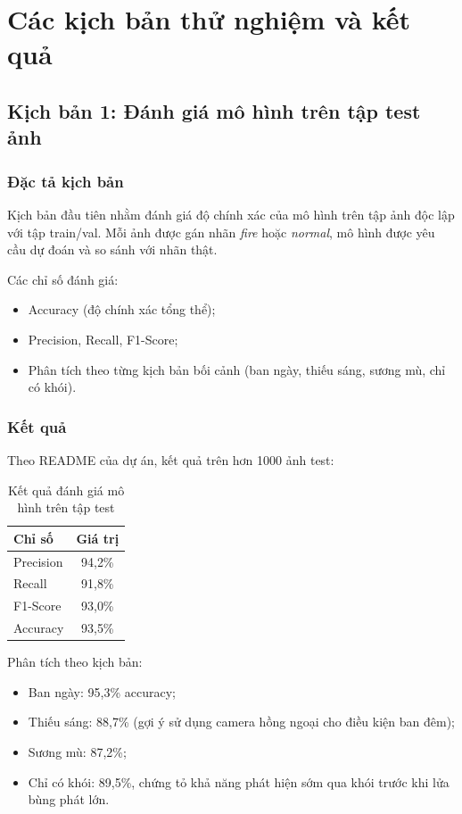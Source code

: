 \documentclass[12pt,a4paper]{report}
\begin{document}
\chapter{Các kịch bản thử nghiệm và kết quả}

\section{Kịch bản 1: Đánh giá mô hình trên tập test ảnh}

\subsection{Đặc tả kịch bản}

Kịch bản đầu tiên nhằm đánh giá độ chính xác của mô hình trên tập ảnh độc lập với tập train/val. Mỗi ảnh được gán nhãn \emph{fire} hoặc \emph{normal}, mô hình được yêu cầu dự đoán và so sánh với nhãn thật.

Các chỉ số đánh giá:
\begin{itemize}
  \item Accuracy (độ chính xác tổng thể);
  \item Precision, Recall, F1-Score;
  \item Phân tích theo từng kịch bản bối cảnh (ban ngày, thiếu sáng, sương mù, chỉ có khói).
\end{itemize}

\subsection{Kết quả}

Theo README của dự án, kết quả trên hơn 1000 ảnh test:
\begin{table}[h]
  \centering
  \caption{Kết quả đánh giá mô hình trên tập test}
  \begin{tabular}{lc}
    \toprule
    Chỉ số & Giá trị \\
    \midrule
    Precision & 94{,}2\% \\
    Recall & 91{,}8\% \\
    F1-Score & 93{,}0\% \\
    Accuracy & 93{,}5\% \\
    \bottomrule
  \end{tabular}
\end{table}

Phân tích theo kịch bản:
\begin{itemize}
  \item Ban ngày: 95{,}3\% accuracy;
  \item Thiếu sáng: 88{,}7\% (gợi ý sử dụng camera hồng ngoại cho điều kiện ban đêm);
  \item Sương mù: 87{,}2\%;
  \item Chỉ có khói: 89{,}5\%, chứng tỏ khả năng phát hiện sớm qua khói trước khi lửa bùng phát lớn.
\end{itemize}
\end{document}
